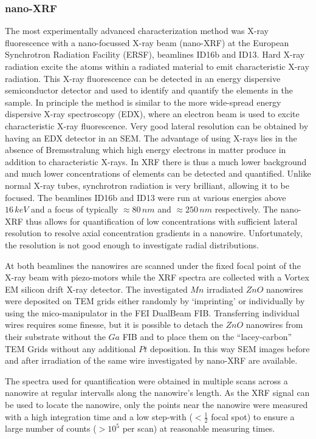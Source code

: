 \subsubsection{nano-XRF}

The most experimentally advanced characterization method was X-ray fluorescence with a nano-focussed X-ray beam (nano-XRF) at the European Synchrotron Radiation Facility (ERSF), beamlines ID16b and ID13. Hard X-ray radiation excite the atoms within a radiated material to emit characteristic X-ray radiation. This X-ray fluorescence can be detected in an energy dispersive semiconductor detector and used to identify and quantify the elements in the sample. In principle the method is similar to the more wide-spread energy dispersive X-ray spectroscopy (EDX), where an electron beam is used to excite characteristic X-ray fluorescence. Very good lateral resolution can be obtained by having an EDX detector in an SEM. The advantage of using X-rays lies in the absence of Bremsstralung which high energy electrons in matter produce in addition to characteristic X-rays. In XRF there is thus a much lower background and much lower concentrations of elements can be detected and quantified. Unlike normal X-ray tubes, synchrotron radiation is very brilliant, allowing it to be focused. The beamlines ID16b and ID13 were run at various energies above $16\,keV$ and a focus of typically $\approx 80\,nm$ and $\approx 250\,nm$ respectively. The nano-XRF thus allows for quantification of low concentrations with sufficient lateral resolution to resolve axial concentration gradients in a nanowire. Unfortunately, the resolution is not good enough to investigate radial distributions.

At both beamlines the nanowires are scanned under the fixed focal point of the X-ray beam with piezo-motors while the XRF spectra are collected with a Vortex EM silicon drift X-ray detector. The investigated $Mn$ irradiated $ZnO$ nanowires were deposited on TEM grids either randomly by `imprinting' or individually by using the mico-manipulator in the FEI DualBeam FIB. Transferring individual wires requires some finesse, but it is possible to detach the $ZnO$ nanowires from their substrate without the $Ga$ FIB and to place them on the ``lacey-carbon'' TEM Grids without any additional $Pt$ deposition. In this way SEM images before and after irradiation of the same wire investigated by nano-XRF are available.

The spectra used for quantification were obtained in multiple scans across a nanowire at regular intervalls along the nanowire's length. As the XRF signal can be used to locate the nanowire, only the points near the nanowire were measured with a high integration time and a low step-with ($< \frac{1}{2}$ focal spot) to ensure a large number of counts ($> 10^5$ per scan) at reasonable measuring times.

